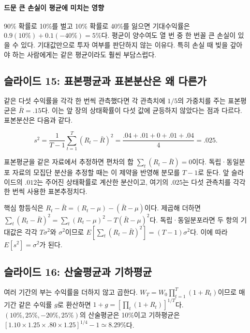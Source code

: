 \documentclass[11pt,a4paper]{article}
\begin{document}
\paragraph{드문 큰 손실이 평균에 미치는 영향}

90\% 확률로 10\%를 벌고 10\% 확률로 40\%를 잃으면 기대수익률은 $0.9(10\%)+0.1(-40\%)=5\%$다. 평균이 양수여도 열 번 중 한 번꼴 큰 손실이 있을 수 있다. 기대값만으로 투자 여부를 판단하지 않는 이유다. 특히 손실 때 빚을 갚아야 하는 사람에게는 같은 평균이라도 훨씬 부담스럽다.
\par

\subsection{슬라이드 15: 표본평균과 표본분산은 왜 다른가}

같은 다섯 수익률을 각각 한 번씩 관측했다면 각 관측치에 $1/5$의 가중치를 주는 표본평균은 $\bar R=.15$다. 이는 앞 장의 상태확률이 다섯 값에 균등하지 않았다는 점과 다르다. 표본분산은 다음과 같다.
\par

\[
s^2=\frac{1}{T-1}\sum_{t=1}^{T}(R_t-\bar R)^2=\frac{.04+.01+0+.01+.04}{4}=.025.
\]

표본평균을 같은 자료에서 추정하면 편차의 합 $\sum_t(R_t-\bar R)=0$이다. 독립·동일분포 자료의 모집단 분산을 추정할 때는 이 제약을 반영해 분모를 $T-1$로 둔다. 앞 슬라이드의 $.012$는 주어진 상태확률로 계산한 분산이고, 여기의 $.025$는 다섯 관측치를 각각 한 번씩 사용한 표본추정치다.
\par

핵심 항등식은 $R_t-\bar R=(R_t-\mu)-(\bar R-\mu)$이다. 제곱해 더하면 $\sum_t(R_t-\bar R)^2=\sum_t(R_t-\mu)^2-T(\bar R-\mu)^2$다. 독립·동일분포라면 두 항의 기대값은 각각 $T\sigma^2$와 $\sigma^2$이므로 $E[\sum_t(R_t-\bar R)^2]=(T-1)\sigma^2$다. 이에 따라 $E[s^2]=\sigma^2$가 된다.
\par

\subsection{슬라이드 16: 산술평균과 기하평균}

여러 기간의 부는 수익률을 더하지 않고 곱한다. $W_T=W_0\prod_{t=1}^{T}(1+R_t)$이므로 매 기간 같은 수익률 $g$로 환산하면 $1+g=[\prod_t(1+R_t)]^{1/T}$다. $(10\%,25\%,-20\%,25\%)$의 산술평균은 10\%이고 기하평균은 $[1.10\times1.25\times.80\times1.25]^{1/4}-1\simeq8.29\%$다.
\par
\end{document}
